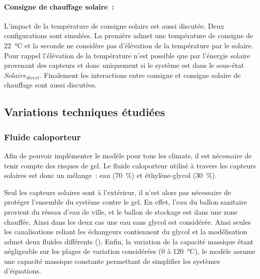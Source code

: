 \paragraph{Consigne de chauffage solaire~:} %
\label{par:consigne_de_chauffage_solaire}
L’impact de la température de consigne solaire est aussi discutée. Deux configurations sont
simulées. La première admet une température de consigne de \SI{22}{\celsius} et la seconde
ne considère pas d’élévation de la température par le solaire. Pour rappel l’élévation de
la température n’est possible que par l’énergie solaire provenant des capteurs et donc
uniquement si le système est dans le sous-état $Solaire_{direct}$. Finalement les interactions
entre consigne et consigne solaire de chauffage sont aussi discutées.


\subsection{Variations techniques étudiées} %
\label{sub:variations_techniques_etudiees}
\subsubsection{Fluide caloporteur} %
\label{ssub:fluide_caloporteur}
Afin de pouvoir implémenter le modèle pour tous les climats, il est nécessaire de
tenir compte des risques de gel. Le fluide caloporteur utilisé à travers les capteurs
solaires est donc un mélange~: eau (\SI{70}{\percent}) et éthylène-glycol (\SI{30}{\percent}).

Seul les capteurs solaires sont à l’extérieur, il n’est alors pas nécessaire de protéger
l’ensemble du système contre le gel. En effet, l’eau du ballon sanitaire provient du
réseau d’eau de ville, et le ballon de stockage est dans une zone chauffée. Ainsi dans les
deux cas une eau sans glycol est considérée. Ainsi seules les canalisations reliant les
échangeurs contiennent du glycol et la modélisation admet deux fluides différents
(). Enfin, la variation de la capacité massique étant négligeable sur
les plages de variation considérées (\num{0} à \SI{120}{\celsius}), le modèle assume une
capacité massique constante permettant de simplifier les systèmes d’équations.

